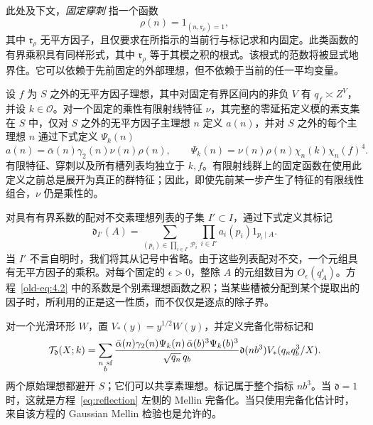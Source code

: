 \documentclass[11pt,a4paper]{article}
\numberwithin{equation}{section}
\numberwithin{figure}{section}
\theoremstyle{definition}
\theoremstyle{remark}
\begin{document}
此处及下文，\emph{固定穿刺} 指一个函数
\[
 \rho(n)=1_{(n,\mathfrak r_\rho)=1},
\]
其中 \(\mathfrak r_\rho\) 无平方因子，且仅要求在所指示的当前行与标记求和内固定。此类函数的有界乘积具有同样形式，其中 \(\mathfrak r_\rho\) 等于其模之积的根式。该根式的范数将被显式地界住。它可以依赖于先前固定的外部理想，但不依赖于当前的任一平均变量。

设 \(f\) 为 \(S\) 之外的无平方因子理想，其中对固定有界区间内的非负 \(V\) 有 \(q_f\asymp Z^V\)，并设 \(k\in\mathcal O\)。对一个固定的乘性有限射线特征 \(\nu\)，其完整的零延拓定义模的素支集在 \(S\) 中，仅对 \(S\) 之外的无平方因子主理想 \(n\) 定义 \(a(n)\)，并对 \(S\) 之外的每个主理想 \(n\) 通过下式定义 \(\Psi_k(n)\)
\[
 a(n)=\bar\alpha(n)\gamma_2(n)\nu(n)\rho(n),\qquad
 \Psi_k(n)=\nu(n)\rho(n)\chi_n(k)\chi_n(f)^4.
\]
有限特征、穿刺以及所有槽列表均独立于 \(k,f\)。有限射线群上的固定函数在使用此定义之前总是展开为真正的群特征；因此，即使先前某一步产生了特征的有限线性组合，\(\nu\) 仍是乘性的。

对具有有界系数的配对不交素理想列表的子集 \(I'\subset I\)，通过下式定义其标记
\begin{equation}\label{old-eq:4.2}
 \mathfrak d_{I'}(A)=
 \sum_{(p_i)\in\prod_{i\in I'}\mathcal P_i}
      \prod_{i\in I'}a_i(p_i)1_{p_i\mid A}.
\end{equation}
当 \(I'\) 不言自明时，我们将其从记号中省略。由于这些列表配对不交，一个元组具有无平方因子的乘积。对每个固定的 \(\epsilon>0\)，整除 \(A\) 的元组数目为 \(O_\epsilon(q_A^\epsilon)\)。方程~\eqref{old-eq:4.2} 中的系数是个别素理想函数之积；当某些槽被分配到某个提取出的因子时，所利用的正是这一性质，而不仅仅是逐点的除子界。

对一个光滑环形 \(W\)，置 \(V_*(y)=y^{1/2}W(y)\)，并定义完备化带标记和
\begin{equation}\label{eq:marked-completion}
 \mathcal T_{\mathfrak d}(X;k)=
 \sum_{\substack{n\ {\rm sf}\\b}}
 \frac{\bar\alpha(n)\gamma_2(n)\Psi_k(n)\,
       \bar\alpha(b)^3\Psi_k(b)^3}{\sqrt{q_n}\,q_b}
 \mathfrak d(nb^3)V_*(q_nq_b^3/X).
\end{equation}
两个原始理想都避开 \(S\)；它们可以共享素理想。标记属于整个指标 \(nb^3\)。当 \(\mathfrak d=1\) 时，这就是方程~\eqref{eq:reflection} 左侧的 Mellin 完备化。当只使用完备化估计时，来自该方程的 Gaussian Mellin 检验也是允许的。
\end{document}

